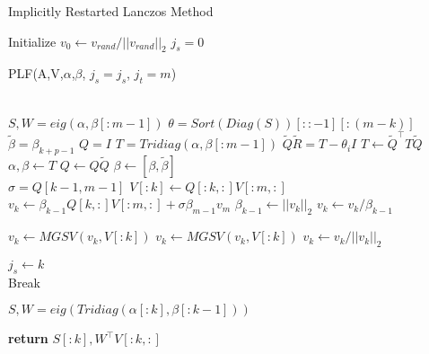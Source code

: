 \documentclass[a4paper]{article}
\begin{document}
\begin{algorithm}
\caption{Implicitly Restarted Lanczos Method}\label{alg:IRLM}
\begin{algorithmic}[1]



\State Initialize $v_0 \gets v_{rand}/||v_{rand}||_2 $
\State $j_s = 0$
        \\

        \State PLF(A,V,$\alpha$,$\beta$, $j_s = j_s$, $j_t = m$) 



        \\
        \State $ S,W = eig(\alpha, \beta[:m-1])$
        \State $ \theta = Sort(Diag(S))[::-1][:(m-k)]$ 
        \State $\tilde{\beta} = \beta_{k+p-1}$
        \State $Q = I$
            \State $T = Tridiag(\alpha, \beta[:m-1]) $
            \State $\tilde{Q} \tilde{R} = T -  \theta_i I$
            \State $T \gets \tilde{Q}^\top T \tilde{Q}$
            \State $ \alpha, \beta \gets T$ 
            \State $ Q \gets Q\tilde{Q}$
        \EndFor
        \State $\beta \gets [\beta , \tilde{\beta}]$ 
        \\
        \State $\sigma = Q[k-1,m-1]$
        \State $V[:k] \gets Q[:k,:] V[:m,:]$
        \State $v_k \gets \beta_{k-1}  Q[k,:] V[:m,:] + \sigma \beta_{m-1}  v_{m}$
        \State $\beta_{k-1} \gets ||v_k||_2 $
        \State $v_k \gets v_k / \beta_{k-1}$

        \State $v_{k} \gets MGSV(v_{k}, V[:k])$
        \State $v_{k} \gets MGSV(v_{k}, V[:k])$
        \State $v_{k} \gets v_{k} / ||v_{k}||_2$
       
        \State $j_s \gets k $ 
        \\
            \State Break
        \EndIf
            
\EndFor

\State $S,W = eig(Tridiag(\alpha[:k], \beta[:k-1]))$


\State \textbf{return} $S[:k], W^\top V[:k,:]$

\EndProcedure
\end{algorithmic}
\end{algorithm}
\end{document}
